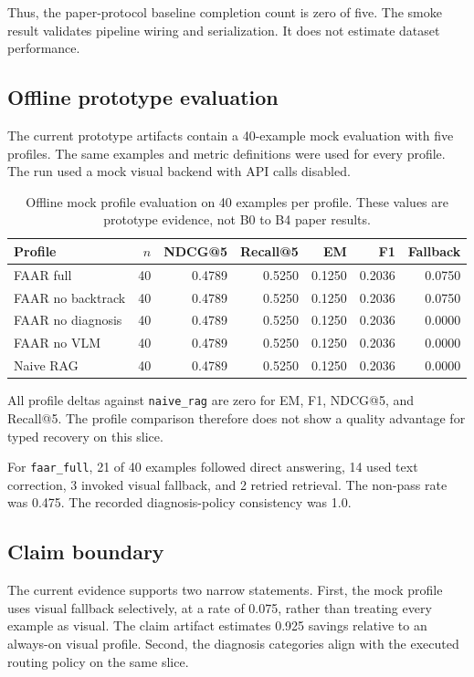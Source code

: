 \documentclass[10pt,twocolumn]{article}
\begin{document}
Thus, the paper-protocol baseline completion count is zero of five. The smoke result validates pipeline wiring and serialization. It does not estimate dataset performance.

\subsection{Offline prototype evaluation}

The current prototype artifacts contain a 40-example mock evaluation with five profiles. The same examples and metric definitions were used for every profile. The run used a mock visual backend with API calls disabled.

\begin{table}[H]
\centering
\caption{Offline mock profile evaluation on 40 examples per profile. These values are prototype evidence, not B0 to B4 paper results.}
\label{tab:profiles}
\scriptsize
\begin{tabularx}{\columnwidth}{@{}Yrrrrrr@{}}
\toprule
Profile & $n$ & NDCG@5 & Recall@5 & EM & F1 & Fallback \\
\midrule
FAAR full & 40 & 0.4789 & 0.5250 & 0.1250 & 0.2036 & 0.0750 \\
FAAR no backtrack & 40 & 0.4789 & 0.5250 & 0.1250 & 0.2036 & 0.0750 \\
FAAR no diagnosis & 40 & 0.4789 & 0.5250 & 0.1250 & 0.2036 & 0.0000 \\
FAAR no VLM & 40 & 0.4789 & 0.5250 & 0.1250 & 0.2036 & 0.0000 \\
Naive RAG & 40 & 0.4789 & 0.5250 & 0.1250 & 0.2036 & 0.0000 \\
\bottomrule
\end{tabularx}
\end{table}

All profile deltas against \texttt{naive\_rag} are zero for EM, F1, NDCG@5, and Recall@5. The profile comparison therefore does not show a quality advantage for typed recovery on this slice.

For \texttt{faar\_full}, 21 of 40 examples followed direct answering, 14 used text correction, 3 invoked visual fallback, and 2 retried retrieval. The non-pass rate was 0.475. The recorded diagnosis-policy consistency was 1.0.

\subsection{Claim boundary}

The current evidence supports two narrow statements. First, the mock profile uses visual fallback selectively, at a rate of 0.075, rather than treating every example as visual. The claim artifact estimates 0.925 savings relative to an always-on visual profile. Second, the diagnosis categories align with the executed routing policy on the same slice.
\end{document}
